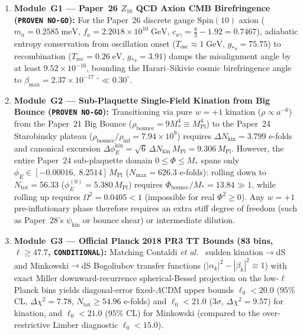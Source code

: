 \documentclass[11pt,a4paper]{article}
\begin{document}
\begin{enumerate}\setlength{\itemsep}{2pt}
\item \textbf{Module~G1 --- Paper~26 $Z_{16}$ QCD Axion CMB Birefringence (\texttt{PROVEN NO-GO}):} For the Paper~26 discrete gauge $\mathrm{Spin}(10)$ axion ($m_a = 0.2585\;\mathrm{meV}$, $f_a = 2.2018\times 10^{10}\;\mathrm{GeV}$, $c_{a\gamma} = \frac{8}{3} - 1.92 = 0.7467$), adiabatic entropy conservation from oscillation onset ($T_{\mathrm{osc}}\approx 1\;\mathrm{GeV}$, $g_{*s}=75.75$) to recombination ($T_{\mathrm{rec}}=0.26\;\mathrm{eV}$, $g_{*s}=3.91$) damps the misalignment angle by at least $9.52\times 10^{-16}$, bounding the Harari--Sikivie cosmic birefringence angle \cite{HarariSikivie1992} to $\beta_{\max} = 2.37\times 10^{-17}\;^\circ \ll 0.30^\circ$.
\item \textbf{Module~G2 --- Sub-Plaquette Single-Field Kination from Big Bounce (\texttt{PROVEN NO-GO}):} Transitioning via pure $w=+1$ kination ($\rho\propto a^{-6}$) from the Paper~21 Big Bounce ($\rho_{\mathrm{bounce}} = 9M_*^4 \equiv M_{\mathrm{Pl}}^4$) to the Paper~24 Starobinsky plateau ($\rho_{\mathrm{bounce}}/\rho_{\mathrm{inf}} = 7.94\times 10^9$) requires $\Delta N_{\mathrm{kin}} = 3.799$ e-folds and canonical excursion $\Delta\phi_E^{\mathrm{kin}} = \sqrt{6}\,\Delta N_{\mathrm{kin}}\,M_{\mathrm{Pl}} = 9.306\,M_{\mathrm{Pl}}$. However, the entire Paper~24 sub-plaquette domain $0\le\Phi\le M_*$ spans only $\phi_E\in[-0.00016,\; 8.2514]\,M_{\mathrm{Pl}}$ ($N_{\max}=626.3$ e-folds): rolling down to $N_{\mathrm{tot}}=56.33$ ($\phi_E^{(0)}=5.380\,M_{\mathrm{Pl}}$) requires $\Phi_{\mathrm{bounce}}/M_* = 13.84 \gg 1$, while rolling up requires $\Omega^2 = 0.0405 < 1$ (impossible for real $\Phi^2\ge 0$). Any $w=+1$ pre-inflationary phase therefore requires an extra stiff degree of freedom (such as Paper~28's $\psi_{\mathrm{kin}}$ or bounce shear) or intermediate dilution.
\item \textbf{Module~G3 --- Official Planck 2018 PR3 TT Bounds (83 bins, $\ell\ge 47.7$, \texttt{CONDITIONAL}):} Matching Contaldi \textit{et al.}\ \cite{Contaldi2003} sudden kination$\to$dS and Minkowski$\to$dS Bogoliubov transfer functions ($|\alpha_k|^2 - |\beta_k|^2 \equiv 1$) with exact Miller downward-recurrence spherical-Bessel projection on the low-$\ell$ Planck bins yields diagonal-error fixed-$\Lambda$CDM upper bounds $\ell_0 < 20.0$ ($95\%$ CL, $\Delta\chi^2 = 7.78$, $N_{\mathrm{tot}} \ge 54.96$ e-folds) and $\ell_0 < 21.0$ ($3\sigma$, $\Delta\chi^2 = 9.57$) for kination, and $\ell_0 < 21.0$ ($95\%$ CL) for Minkowski (compared to the over-restrictive Limber diagnostic $\ell_0 < 15.0$).

\end{enumerate}
\end{document}
